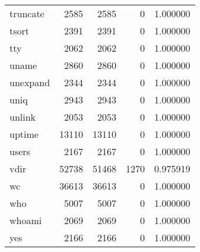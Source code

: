 \begin{longtable}{lrrrr}
truncate  &                     2585 &         2585 &             0 &                 1.000000 \\
tsort     &                     2391 &         2391 &             0 &                 1.000000 \\
tty       &                     2062 &         2062 &             0 &                 1.000000 \\
uname     &                     2860 &         2860 &             0 &                 1.000000 \\
unexpand  &                     2344 &         2344 &             0 &                 1.000000 \\
uniq      &                     2943 &         2943 &             0 &                 1.000000 \\
unlink    &                     2053 &         2053 &             0 &                 1.000000 \\
uptime    &                    13110 &        13110 &             0 &                 1.000000 \\
users     &                     2167 &         2167 &             0 &                 1.000000 \\
vdir      &                    52738 &        51468 &          1270 &                 0.975919 \\
wc        &                    36613 &        36613 &             0 &                 1.000000 \\
who       &                     5007 &         5007 &             0 &                 1.000000 \\
whoami    &                     2069 &         2069 &             0 &                 1.000000 \\
yes       &                     2166 &         2166 &             0 &                 1.000000 \\
\end{longtable}
